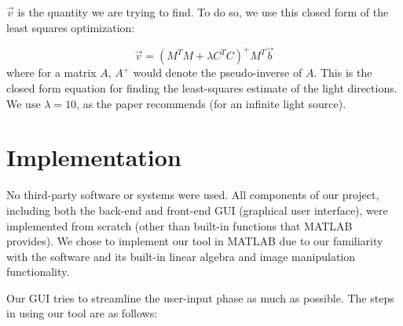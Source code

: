 \documentclass[10pt,twocolumn,letterpaper]{article}
\begin{document}
$\vec{v}$ is the quantity we are trying to find. To do so, we use this closed form of the least squares optimization:

\[\vec{v} = (M^TM + \lambda C^TC)^+M^T\vec{b}\] where for a matrix $A$, $A^+$ would denote the pseudo-inverse of $A$. This is the closed form equation for finding the least-squares estimate of the light directions. We use $\lambda = 10$, as the paper recommends (for an infinite light source).

\section{Implementation}

No third-party software or systems were used. All components of our project, including both the back-end and front-end GUI (graphical user interface), were implemented from scratch (other than built-in functions that MATLAB provides). We chose to implement our tool in MATLAB due to our familiarity with the software and its built-in linear algebra and image manipulation functionality.

Our GUI tries to streamline the user-input phase as much as possible. The steps in using our tool are as follows:
\end{document}
